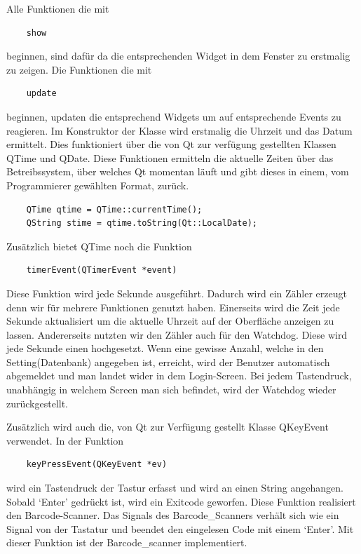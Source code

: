 \documentclass[11pt,a4paper]{article} %
\begin{document}
	Alle Funktionen die mit 
	\begin{frame}

\begin{lstlisting}
	show
	\end{lstlisting}
\end{frame}
	beginnen, sind dafür da die entsprechenden Widget in dem Fenster zu erstmalig zu zeigen.
	Die Funktionen die mit 
	\begin{frame}

\begin{lstlisting}
	update
	\end{lstlisting}
\end{frame}
	beginnen, updaten die entsprechend Widgets um auf entsprechende Events zu reagieren.
	Im Konstruktor der Klasse wird erstmalig die Uhrzeit und das Datum ermittelt. Dies funktioniert über die von Qt zur verfügung gestellten Klassen QTime und QDate.
	Diese Funktionen ermitteln die aktuelle Zeiten über das Betreibssystem, über welches Qt momentan läuft und gibt dieses in einem, vom Programmierer gewählten Format, zurück.
	
	\begin{frame}

\begin{lstlisting}
	QTime qtime = QTime::currentTime();
	QString stime = qtime.toString(Qt::LocalDate);
	\end{lstlisting}
\end{frame}
	Zusätzlich bietet QTime noch die Funktion 
	\begin{frame}

\begin{lstlisting}
	timerEvent(QTimerEvent *event)
	\end{lstlisting}
\end{frame}
	Diese Funktion wird jede Sekunde ausgeführt. Dadurch wird ein Zähler erzeugt denn wir für mehrere Funktionen genutzt haben.
	Einerseits wird die Zeit jede Sekunde aktualisiert um die aktuelle Uhrzeit auf der Oberfläche anzeigen zu lassen.
	Andererseits nutzten wir den Zähler auch für den Watchdog. Diese wird jede Sekunde einen hochgesetzt. Wenn eine gewisse Anzahl, welche in den Setting(Datenbank) angegeben ist, erreicht, 
	wird der Benutzer automatisch abgemeldet und man landet wider in dem Login-Screen. Bei jedem Tastendruck, unabhängig in welchem Screen man sich befindet, wird der Watchdog wieder zurückgestellt.
\par	
	Zusätzlich wird auch die, von Qt zur Verfügung gestellt Klasse QKeyEvent verwendet. In der Funktion 
	\begin{frame}

\begin{lstlisting}
	keyPressEvent(QKeyEvent *ev)
	\end{lstlisting}
\end{frame}
	  wird ein Tastendruck der Tastur erfasst und wird an einen String angehangen.
	Sobald `Enter' gedrückt ist, wird ein Exitcode geworfen. Diese Funktion realisiert den Barcode-Scanner. 
	Das Signals des Barcode\_Scanners verhält sich wie ein Signal von der Tastatur und beendet den eingelesen Code mit einem `Enter'. Mit dieser Funktion ist der Barcode\_scanner implementiert.
\par	
\end{document}
